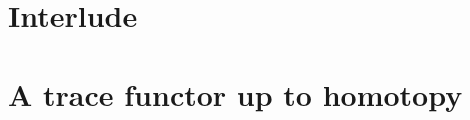 \documentclass[12pt]{nuthesis} %
\theoremstyle{definition}
\theoremstyle{remark}
\theoremstyle{example}
\begin{document}
\chapter{Interlude}
	
	

\chapter{A trace functor up to homotopy}
	
	
	

\begin{singlespace}
\clearpage{} %

\end{singlespace}

\appendix		%



\end{document}
